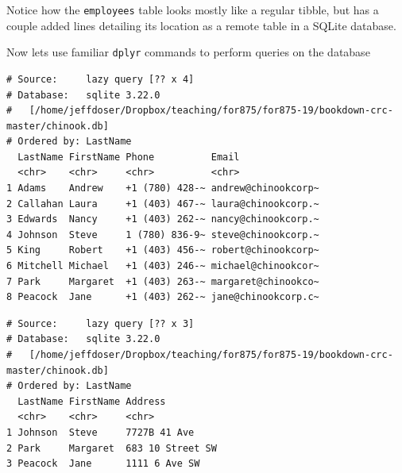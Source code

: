 \documentclass[]{krantz}
\makeatletter
\newenvironment{Shaded}{\begin{snugshade}}{\end{snugshade}}
\newcommand{\KeywordTok}[1]{\textcolor[rgb]{0.27,0.27,0.27}{\textbf{#1}}}
\newcommand{\StringTok}[1]{\textcolor[rgb]{0.5,0.5,0.5}{#1}}
\newcommand{\OperatorTok}[1]{\textcolor[rgb]{0.43,0.43,0.43}{\textbf{#1}}}
\newcommand{\NormalTok}[1]{#1}
\newenvironment{kframe}{%
\medskip{}
\setlength{\fboxsep}{.8em}
 \def\at@end@of@kframe{}%
 \ifinner\ifhmode%
  \def\at@end@of@kframe{\end{minipage}}%
  \begin{minipage}{\columnwidth}%
 \fi\fi%
 \def\FrameCommand##1{\hskip\@totalleftmargin \hskip-\fboxsep
 \colorbox{shadecolor}{##1}\hskip-\fboxsep
     \hskip-\linewidth \hskip-\@totalleftmargin \hskip\columnwidth}%
 \MakeFramed {\advance\hsize-\width
   \@totalleftmargin\z@ \linewidth\hsize
   \@setminipage}}%
 {\par\unskip\endMakeFramed%
 \at@end@of@kframe}
\renewenvironment{Shaded}{\begin{kframe}}{\end{kframe}}
\makeatother
\begin{document}
Notice how the \texttt{employees} table looks mostly like a regular
tibble, but has a couple added lines detailing its location as a remote
table in a SQLite database.

Now lets use familiar \texttt{dplyr} commands to perform queries on the
database

\begin{Shaded}
\end{Shaded}

\begin{verbatim}
# Source:     lazy query [?? x 4]
# Database:   sqlite 3.22.0
#   [/home/jeffdoser/Dropbox/teaching/for875/for875-19/bookdown-crc-master/chinook.db]
# Ordered by: LastName
  LastName FirstName Phone          Email              
  <chr>    <chr>     <chr>          <chr>              
1 Adams    Andrew    +1 (780) 428-~ andrew@chinookcorp~
2 Callahan Laura     +1 (403) 467-~ laura@chinookcorp.~
3 Edwards  Nancy     +1 (403) 262-~ nancy@chinookcorp.~
4 Johnson  Steve     1 (780) 836-9~ steve@chinookcorp.~
5 King     Robert    +1 (403) 456-~ robert@chinookcorp~
6 Mitchell Michael   +1 (403) 246-~ michael@chinookcor~
7 Park     Margaret  +1 (403) 263-~ margaret@chinookco~
8 Peacock  Jane      +1 (403) 262-~ jane@chinookcorp.c~
\end{verbatim}

\begin{Shaded}
\end{Shaded}

\begin{verbatim}
# Source:     lazy query [?? x 3]
# Database:   sqlite 3.22.0
#   [/home/jeffdoser/Dropbox/teaching/for875/for875-19/bookdown-crc-master/chinook.db]
# Ordered by: LastName
  LastName FirstName Address         
  <chr>    <chr>     <chr>           
1 Johnson  Steve     7727B 41 Ave    
2 Park     Margaret  683 10 Street SW
3 Peacock  Jane      1111 6 Ave SW   
\end{verbatim}
\end{document}
